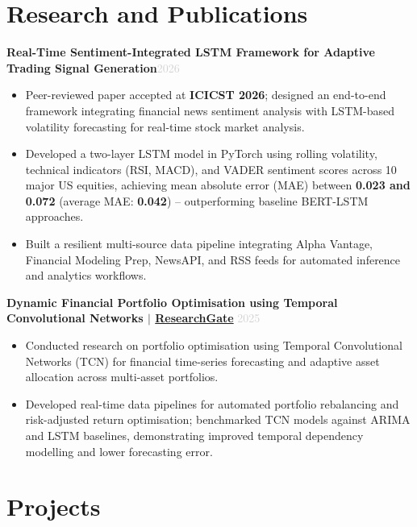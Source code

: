 \documentclass[a4paper,10.5pt]{article}
\newcommand{\resumeProject}[2]{%
  \vspace{3pt}%
  \noindent\textbf{\normalsize #1}\hfill\textcolor{lightgray}{\small #2}%
  \vspace{1pt}%
}
\newcommand{\resumeItem}[1]{%
  \item\small{#1}%
}
\newcommand{\resumeItemListStart}{%
  \begin{itemize}[leftmargin=0.18in, itemsep=1pt, topsep=2pt, parsep=0pt]%
}
\newcommand{\resumeItemListEnd}{%
  \end{itemize}\vspace{1pt}%
}
\begin{document}

\section{Research and Publications}

\resumeProject
  {Real-Time Sentiment-Integrated LSTM Framework for Adaptive Trading Signal Generation}{2026}

\resumeItemListStart
  \resumeItem{
    Peer-reviewed paper accepted at \textbf{ICICST 2026}; designed an end-to-end framework integrating financial news sentiment analysis with LSTM-based volatility forecasting for real-time stock market analysis.
  }
  \resumeItem{
    Developed a two-layer LSTM model in PyTorch using rolling volatility, technical indicators (RSI, MACD), and VADER sentiment scores across 10 major US equities, achieving mean absolute error (MAE) between \textbf{0.023 and 0.072} (average MAE: \textbf{0.042}) -- outperforming baseline BERT-LSTM approaches.
  }
  \resumeItem{
    Built a resilient multi-source data pipeline integrating Alpha Vantage, Financial Modeling Prep, NewsAPI, and RSS feeds for automated inference and analytics workflows.
  }
\resumeItemListEnd

\vspace{4pt}
\resumeProject
  {Dynamic Financial Portfolio Optimisation using Temporal Convolutional Networks 
  $|$ \href{https://www.researchgate.net/publication/394630875_Dynamic_Financial_Portfolio_Optimization_Using_Temporal_Convolutional_Networks_and_Real-Time_Data_Analysis}{ResearchGate} \hfill}{2025}

\resumeItemListStart
  \resumeItem{
    Conducted research on portfolio optimisation using Temporal Convolutional Networks (TCN) for financial time-series forecasting and adaptive asset allocation across multi-asset portfolios.
  }
  \resumeItem{
    Developed real-time data pipelines for automated portfolio rebalancing and risk-adjusted return optimisation; benchmarked TCN models against ARIMA and LSTM baselines, demonstrating improved temporal dependency modelling and lower forecasting error.
  }
\resumeItemListEnd


\section{Projects}
\end{document}
